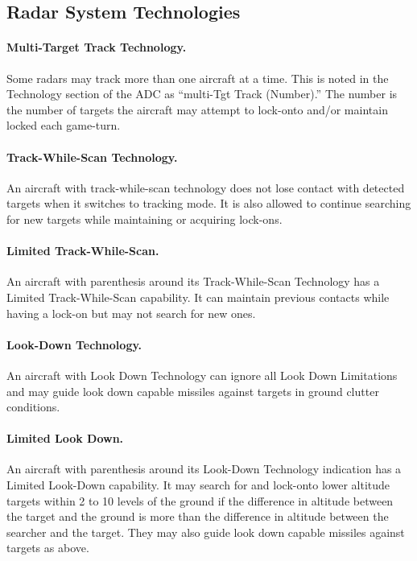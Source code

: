 \begin{advancedrules}

\section{Radar System Technologies}

\paragraph{Multi-Target Track Technology.}\label{rule:multi-target-track-technology} Some radars may track more than one aircraft at a time. This is noted in the Technology section of the ADC as “multi-Tgt Track (Number).” The number is the number of targets the aircraft may attempt to lock-onto and/or maintain locked each game-turn.

\paragraph{Track-While-Scan Technology.} \label{rule:track-while-scan-technology} An aircraft with track-while-scan technology does not lose contact with detected targets when it switches to tracking mode. It is also allowed to continue searching for new targets while maintaining or acquiring lock-ons.

\paragraph{Limited Track-While-Scan.} An aircraft with parenthesis around its Track-While-Scan Technology has a Limited Track-While-Scan capability. It can maintain previous contacts while having a lock-on but may not search for new ones.

\paragraph{Look-Down Technology.} \label{rule:look-down-missiles}
An aircraft with Look Down Technology can ignore all Look Down Limitations and may guide look down capable missiles against targets in ground clutter conditions.

\paragraph{Limited Look Down.} An aircraft with parenthesis around its Look-Down Technology indication has a Limited Look-Down capability.  It may search for and lock-onto lower altitude targets within 2 to 10 levels of the ground if the difference in altitude between the target and the ground is more than the difference in altitude between the searcher and the target. They may also guide look down capable missiles against targets as above.


\end{advancedrules}
